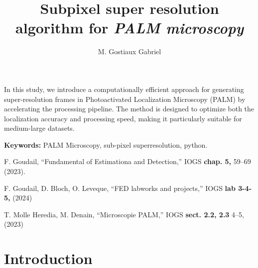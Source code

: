 \documentclass[10pt,letterpaper]{article}
\begin{document}
\title{Subpixel super resolution algorithm for \textit{PALM microscopy}}

\author{M. Gostiaux Gabriel}

\address{M. Gabriel Gostiaux, Master of Science student, Institute of Optics, \\ Palaiseau, 91 120, France}




\begin{abstract*}
In this study, we introduce a computationally efficient approach for generating super-resolution frames in Photoactivated Localization Microscopy (PALM) by accelerating the processing pipeline. The method is designed to optimize both the localization accuracy and processing speed, making it particularly suitable for medium-large datasets.

\textbf{Keywords:} PALM Microscopy, sub-pixel superresolution, python. 

\end{abstract*}


\begin{thebibliography}{99}

 F. Goudail, ``Fundamental of Estimationa and Detection,'' IOGS {\bf chap. 5,} 59--69 (2023).

 F. Goudail, D. Bloch, O. Leveque, ``FED labworks and projects,'' IOGS {\bf lab 3-4-5,} (2024)

 T. Molle Heredia, M. Denain, ``Microscopie PALM,'' IOGS {\bf sect. 2.2, 2.3} 4--5, (2023)

\end{thebibliography}

\section{Introduction}
\end{document}

